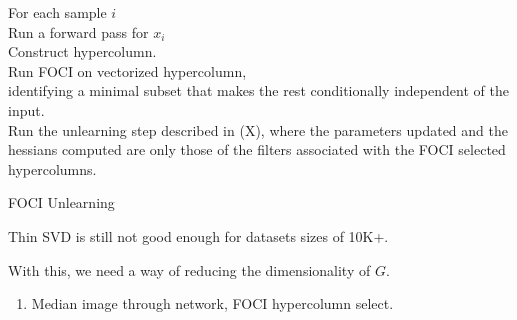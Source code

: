 \begin{algorithm}
\SetAlgoLined
{}

For each sample $i$ \\
Run a forward pass for $x_i$ \\
Construct hypercolumn. \\
Run FOCI on vectorized hypercolumn, \\ identifying a minimal subset that makes the rest conditionally independent of the input. \\
Run the unlearning step described in (X), where the parameters updated and the hessians computed are only those of the filters associated with the FOCI selected hypercolumns.
\caption{FOCI Unlearning}
\end{algorithm}

Thin SVD is still not good enough for datasets sizes of 10K+.

With this, we need a way of reducing the dimensionality of $G$.

\begin{enumerate}
    \item Median image through network, FOCI hypercolumn select.
\end{enumerate}

